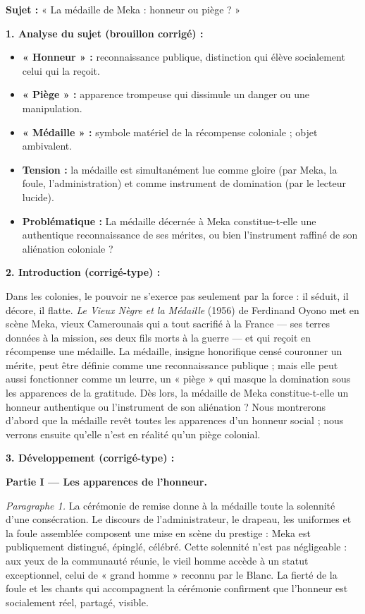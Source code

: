 \documentclass[11pt]{article}
\begin{document}
\begin{corrige}
\textbf{Sujet :} « La médaille de Meka : honneur ou piège ? »

\textbf{1. Analyse du sujet (brouillon corrigé) :}
\begin{itemize}
\item \textbf{« Honneur » :} reconnaissance publique, distinction qui élève socialement celui qui la reçoit.
\item \textbf{« Piège » :} apparence trompeuse qui dissimule un danger ou une manipulation.
\item \textbf{« Médaille » :} symbole matériel de la récompense coloniale ; objet ambivalent.
\item \textbf{Tension :} la médaille est simultanément lue comme gloire (par Meka, la foule, l'administration) et comme instrument de domination (par le lecteur lucide).
\item \textbf{Problématique :} La médaille décernée à Meka constitue-t-elle une authentique reconnaissance de ses mérites, ou bien l'instrument raffiné de son aliénation coloniale ?
\end{itemize}

\textbf{2. Introduction (corrigé-type) :}

Dans les colonies, le pouvoir ne s'exerce pas seulement par la force : il séduit, il décore, il flatte. \emph{Le Vieux Nègre et la Médaille} (1956) de Ferdinand Oyono met en scène Meka, vieux Camerounais qui a tout sacrifié à la France — ses terres données à la mission, ses deux fils morts à la guerre — et qui reçoit en récompense une médaille. La médaille, insigne honorifique censé couronner un mérite, peut être définie comme une reconnaissance publique ; mais elle peut aussi fonctionner comme un leurre, un « piège » qui masque la domination sous les apparences de la gratitude. Dès lors, la médaille de Meka constitue-t-elle un honneur authentique ou l'instrument de son aliénation ? Nous montrerons d'abord que la médaille revêt toutes les apparences d'un honneur social ; nous verrons ensuite qu'elle n'est en réalité qu'un piège colonial.

\textbf{3. Développement (corrigé-type) :}

\textbf{Partie I — Les apparences de l'honneur.}

\emph{Paragraphe 1.} La cérémonie de remise donne à la médaille toute la solennité d'une consécration. Le discours de l'administrateur, le drapeau, les uniformes et la foule assemblée composent une mise en scène du prestige : Meka est publiquement distingué, épinglé, célébré. Cette solennité n'est pas négligeable : aux yeux de la communauté réunie, le vieil homme accède à un statut exceptionnel, celui de « grand homme » reconnu par le Blanc. La fierté de la foule et les chants qui accompagnent la cérémonie confirment que l'honneur est socialement réel, partagé, visible.


\end{corrige}
\end{document}
